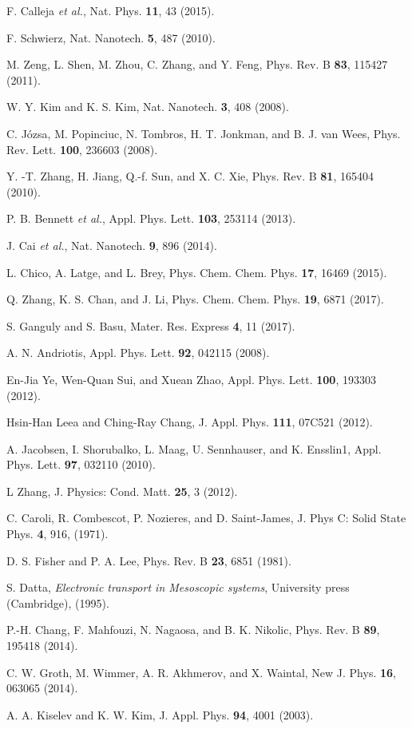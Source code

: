 \documentclass[prb,aps,twocolumn,amsmath,amssymb,floatfix,
superscriptaddress]{revtex4}
\begin{document}
\begin{thebibliography}{99}
 F. Calleja {\it et al.}, Nat. Phys. {\bf 11}, 43
  (2015).

 F. Schwierz, Nat. Nanotech. {\bf 5}, 487 (2010).

 M. Zeng, L. Shen, M. Zhou, C. Zhang, and Y. Feng,
  Phys. Rev. B {\bf 83}, 115427 (2011).

 W. Y. Kim and K. S. Kim, Nat. Nanotech. {\bf 3}, 408
  (2008).

 C. J\'{o}zsa, M. Popinciuc, N. Tombros, H. T. Jonkman,
  and B. J. van Wees, Phys. Rev. Lett. {\bf 100}, 236603 (2008).

 Y. -T. Zhang, H. Jiang, Q.-f. Sun, and X. C. Xie,
  Phys. Rev. B {\bf 81}, 165404 (2010).

 P. B. Bennett {\it et al.}, Appl. Phys. Lett. {\bf
  103}, 253114 (2013).

 J. Cai {\it et al.}, Nat. Nanotech. {\bf 9}, 896 (2014).

 L. Chico, A. Latge, and L. Brey,
  Phys. Chem. Chem. Phys. {\bf 17}, 16469 (2015).

 Q. Zhang, K. S. Chan, and J. Li,
  Phys. Chem. Chem. Phys. {\bf 19}, 6871 (2017).

 S. Ganguly and S. Basu, Mater. Res. Express
  {\bf4}, 11 (2017).

 A. N. Andriotis, Appl. Phys. Lett. {\bf 92}, 042115
  (2008).

 En-Jia Ye, Wen-Quan Sui, and Xuean Zhao,
  Appl. Phys. Lett. {\bf 100}, 193303 (2012).

 Hsin-Han Leea and Ching-Ray Chang,
  J. Appl. Phys. {\bf 111}, 07C521 (2012).

 A. Jacobsen, I. Shorubalko, L. Maag, U. Sennhauser,
  and K. Ensslin1, Appl. Phys. Lett. {\bf 97}, 032110 (2010).

 L Zhang, J. Physics: Cond. Matt. {\bf 25}, 3
  (2012).

 C. Caroli, R. Combescot, P. Nozieres, and
  D. Saint-James, J. Phys C: Solid State Phys. {\bf4}, 916, (1971).

 D. S. Fisher and P. A. Lee, Phys. Rev. B
  {\bf{23}}, 6851 (1981).

 S. Datta, \textit{Electronic transport in Mesoscopic
  systems}, University press (Cambridge), (1995).


 P.-H. Chang, F. Mahfouzi, N. Nagaosa, and
  B. K. Nikolic, Phys. Rev. B {\bf 89}, 195418 (2014).

 C. W. Groth, M. Wimmer, A. R. Akhmerov, and
  X. Waintal, New J. Phys. {\bf 16}, 063065 (2014).


 A. A. Kiselev and K. W. Kim, J. Appl. Phys. {\bf
  94}, 4001 (2003).
\end{thebibliography}
\end{document}
